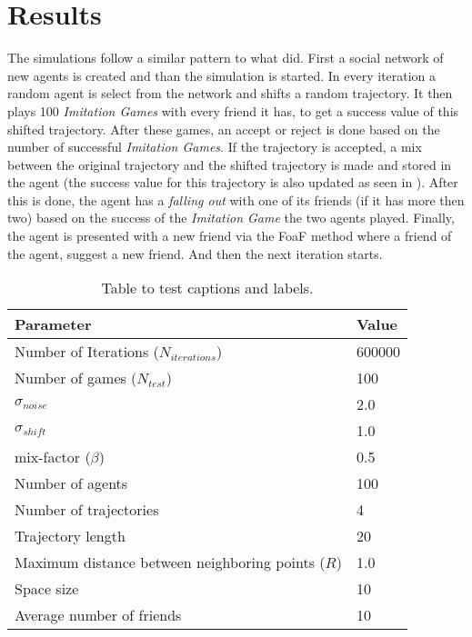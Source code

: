 \section{Results}
The simulations follow a similar pattern to what \cite{de2010multi} did.
First a social network of new agents is created and than the simulation is started.
In every iteration a random agent is select from the network and shifts a random trajectory.
It then plays 100 \textit{Imitation Games} with every friend it has, to get a success value of this shifted trajectory.
After these games, an accept or reject is done based on the number of successful \textit{Imitation Games}.
If the trajectory is accepted, a mix between the original trajectory and the shifted trajectory is made and stored in the agent (the success value for this trajectory is also updated as seen in \citep{de2010multi}).
After this is done, the agent has a \textit{falling out} with one of its friends (if it has more then two) based on the success of the \textit{Imitation Game} the two agents played.
Finally, the agent is presented with a new friend via the FoaF method where a friend of the agent, suggest a new friend.
And then the next iteration starts.

\begin{table}[t]
    \centering
    \begin{tabular}{ll}
    \hline
    Parameter                                         & Value  \\ \hline
    Number of Iterations ($N_{iterations}$)           & 600000 \\
    Number of games ($N_{test}$)                      & 100    \\
    $\sigma_{noise}$                                  & 2.0    \\
    $\sigma_{shift}$                                  & 1.0    \\
    mix-factor ($\beta$)                              & 0.5    \\
    Number of agents                                  & 100    \\
    Number of trajectories                            & 4      \\
    Trajectory length                                 & 20     \\
    Maximum distance between neighboring points ($R$) & 1.0    \\
    Space size                                        & 10     \\
    Average number of friends                         & 10    
\end{tabular}
    \caption{Table to test captions and labels.}
    \label{table:simulation}
\end{table}


